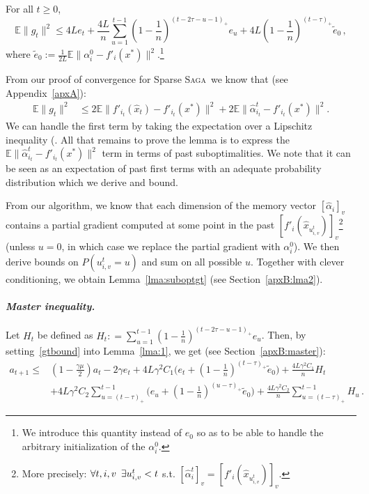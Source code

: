 \documentclass[twoside, 11pt]{article}
\newcommand{\stepsize}{\gamma}
\newcommand{\strongconvex}{\mu}
\newcommand{\overlap}{\tau}
\newcommand{\lipschitz}{L}
\newcommand{\E}{\mathbb{E}}
\newcommand{\SAGA}{\textsc{Saga}}
\begin{document}
\begin{lemma} [Suboptimality bound on $\E \|g_t\|^2$]\label{lma:suboptgt}
	For all $t \geq 0$,
	\begin{equation}\label{gtbound}
	\E\|g_t\|^2
	\leq 4\lipschitz e_t
	+ \frac{4\lipschitz}{n} \sum_{u=1}^{t-1} (1 - \frac{1}{n})^{(t-2\overlap-u -1)_+} e_u
	+ 4\lipschitz (1 - \frac{1}{n})^{(t-\overlap)_+} \tilde e_0  \, ,
	\end{equation}
	where $\tilde e_0 := \frac{1}{2\lipschitz} \E\|\alpha_i^0 - f'_i(x^*)\|^2$.\footnote{We introduce this quantity instead of $e_0$ so as to be able to handle the arbitrary initialization of the $\alpha_i^0$.}
\end{lemma}
From our proof of convergence for Sparse \SAGA\ we know that (see Appendix~\ref{apxA}):
\begin{align}
\E\|g_t\|^2
&\leq 2 \E \|f'_{i_t}(\hat x_t)-f'_{i_t}(x^*)\|^2
+ 2 \E \|\hat \alpha_{i_t}^t - f'_{i_t}(x^*)\|^2 .
\end{align}
We can handle the first term by taking the expectation over a Lipschitz inequality (\citet[Equations 7 and 8]{qsaga}.
All that remains to prove the lemma is to express the $\E \|\hat \alpha_{i_t}^t - f'_{i_t}(x^*)\|^2$ term in terms of past suboptimalities.
We note that it can be seen as an expectation of past first terms with an adequate probability distribution which we derive and bound.

From our algorithm, we know that each dimension of the memory vector $[\hat \alpha_i]_v$ contains a partial gradient computed at some point in the past $[f'_i(\hat x_{u_{i, v}^{t}})]_v$\footnote{More precisely: $\forall t, i, v \hspace{0.5em}\exists u_{i, v}^t<t$ s.t. $[\hat \alpha_{i}^t]_v = [f'_{i}(\hat x_{u_{i, v}^{t}})]_v$.} (unless $u=0$, in which case we replace the partial gradient with $\alpha_i^0$).
We then derive bounds on $P(u_{i,v}^t = u)$ and sum on all possible $u$.
Together with clever conditioning, we obtain Lemma~\ref{lma:suboptgt} (see Section~\ref{apxB:lma2}).

\paragraph{\textit{Master inequality.}}
Let $H_t$ be defined as ${H_t: = \sum_{u=1}^{t-1} (1 - \frac{1}{n})^{(t-2\overlap-u -1)_+} e_u}$.
Then, by setting~\eqref{gtbound} into Lemma~\ref{lma:1}, we get (see Section~\ref{apxB:master}):
\begin{equation}\label{master}
\begin{aligned}
a_{t+1}
\leq &(1 - \frac{\stepsize\strongconvex}{2}) a_t
- 2\stepsize e_t
+ 4\lipschitz\stepsize^2 C_1 \big(e_t  + (1 - \frac{1}{n})^{(t-\overlap)_+} \tilde e_0 \big)
+ \frac{4\lipschitz\stepsize^2 C_1}{n} H_t
\\
&+4\lipschitz\stepsize^2 C_2\sum_{u=(t-\overlap)_+}^{t-1} (e_u +  (1 - \frac{1}{n})^{(u - \overlap)_+} \tilde e_0 \big)
+\frac{4\lipschitz\stepsize^2 C_2}{n} \sum_{u=(t-\overlap)_+}^{t-1} H_u  \, .
\end{aligned}
\end{equation}
\end{document}
